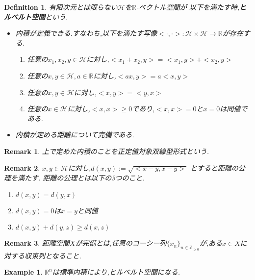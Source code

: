 \documentclass{jarticle}
\newtheorem{dfn}[thm]{Definition}
\newtheorem{epl}[thm]{Example}
\newtheorem*{rem}{Remark}
\begin{document}
\begin{dfn}
  有限次元とは限らない$\mathcal{H}$を$\mathbb{R}$-ベクトル空間が
  以下を満たす時,\textbf{ヒルベルト空間}という.
  \begin{itemize}
    \item 内積が定義できる.すなわち,以下を満たす写像$< \cdot , \cdot >: \mathcal{H} \times \mathcal{H} \to \mathbb{R}$が存在する.
      \begin{enumerate}
        \item 任意の$x_1,x_2,y \in \mathcal{H}$に対し,${<}x_1 +x_2,y{>}= {<}x_1,y{>} +{<}x_2,y{>}$
        \item 任意の$x,y \in \mathcal{H},a \in \mathbb{R}$に対し,$<ax,y> =a<x,y>$
        \item 任意の$x,y \in \mathcal{H}$に対し,$<x,y>=<y,x>$
        \item 任意の$x \in \mathcal{H}$に対し,${<}x,x{>} \ge 0$であり,${<}x,x{>}=0$と$x=0$は同値である.
      \end{enumerate}
    \item 内積が定める距離について完備である.
  \end{itemize}
\end{dfn}
\begin{rem}
上で定めた内積のことを正定値対象双線型形式という.
\end{rem}
\begin{rem}
  $x,y \in \mathcal{H}$に対し,$d(x,y):=\sqrt{{<}x-y,x-y{>}}$
 とすると距離の公理を満たす.
 距離の公理とは以下の3つのこと.
 \begin{enumerate}
   \item $d(x,y)=d(y,x)$
   \item $d(x,y)=0$は$x=y$と同値
   \item $d(x,y)+d(y,z) \ge d(x,z)$
 \end{enumerate}
\end{rem}
\begin{rem}
 距離空間$X$が完備とは,任意のコーシー列$\{x_n\}_{n \in \mathbb{Z}_{\ge 0}}$が,ある$x \in X$に対する収束列となること.
\end{rem}
\begin{epl}
 $\mathbb{R}^n$は標準内積により,ヒルベルト空間になる.
\end{epl}
\end{document}
